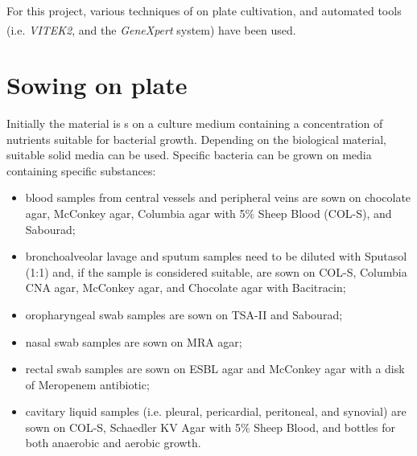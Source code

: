 \documentclass[11pt]{report}
\begin{document}
For this project, various techniques of on plate cultivation, and automated tools (i.e. \emph{VITEK}\textsuperscript{\textregistered}\emph{2}, and the \emph{GeneXpert} system) have been used.

\section{Sowing on plate}
Initially the material is s on a culture medium containing a concentration of nutrients suitable for bacterial growth.
Depending on the biological material, suitable solid media can be used. 
Specific bacteria can be grown on media containing specific substances:
\begin{itemize}
\item blood samples from central vessels and peripheral veins are sown on chocolate agar, McConkey agar, Columbia agar with 5$\%$ Sheep Blood (COL-S), and Sabourad;
\item bronchoalveolar lavage and sputum samples need to be diluted with Sputasol (1:1) and, if the sample is considered suitable, are sown on COL-S, Columbia CNA agar, McConkey agar, and Chocolate agar with Bacitracin;
\item oropharyngeal swab samples are sown on TSA-II and Sabourad;
\item nasal swab samples are sown on MRA agar;
\item rectal swab samples are sown on ESBL agar and McConkey agar with a disk of Meropenem antibiotic;
\item cavitary liquid samples (i.e. pleural, pericardial, peritoneal, and synovial) are sown on COL-S, Schaedler KV Agar with 5$\%$ Sheep Blood, and bottles for both anaerobic and aerobic growth.
\end{itemize}
\end{document}

